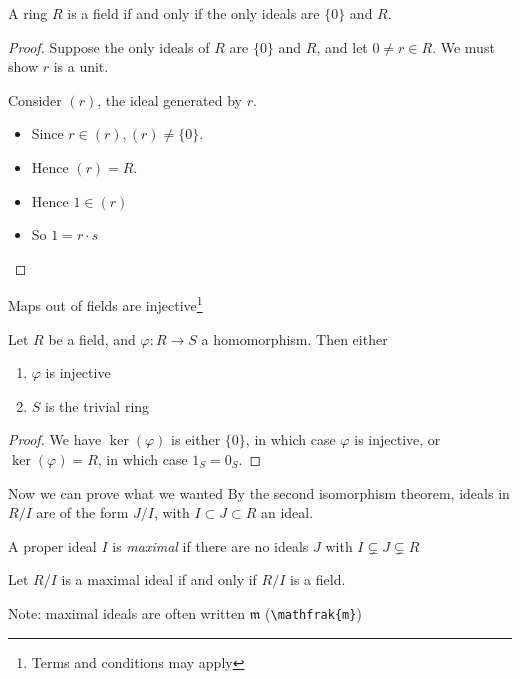\documentclass{beamer}
\begin{document}
\begin{frame}

\begin{lemma} A ring $R$ is a field if and only if the only ideals are $\{0\}$ and $R$.
\end{lemma}
\begin{proof}
Suppose the only ideals of $R$ are $\{0\}$ and $R$, and let $0\neq r\in R$.  We must show $r$ is a unit.

Consider $(r)$, the ideal generated by $r$. 
\begin{itemize}
\item  Since $r\in(r), (r)\neq\{0\}$.  
\item Hence $(r)=R$.  
\item Hence $1\in (r)$
\item So $1=r\cdot s$
\end{itemize}


\end{proof}

\end{frame}

\begin{frame}{Maps out of fields are injective\footnote{Terms and conditions may apply}}
\begin{lemma} Let $R$ be a field, and $\varphi:R\to S$ a homomorphism.  Then either
\begin{enumerate}
\item $\varphi$ is injective
\item $S$ is the trivial ring
\end{enumerate}
\end{lemma}

\begin{proof}
We have $\ker(\varphi)$ is either $\{0\}$, in which case $\varphi$ is injective, or $\ker(\varphi)=R$, in which case $1_S=0_S$.
\end{proof}

\end{frame}

\begin{frame}{Now we can prove what we wanted }
By the second isomorphism theorem, ideals in $R/I$ are of the form $J/I$, with $I\subset J\subset R$ an ideal.

\begin{definition}
A proper ideal $I$ is \emph{maximal} if there are no ideals $J$ with $I\subsetneq J\subsetneq R$
\end{definition}

\begin{lemma}
Let $R/I$ is a maximal ideal if and only if $R/I$ is a field.
\end{lemma}

Note: maximal ideals are often written $\mathfrak{m}$ ({\tt \textbackslash mathfrak\{m\}})


\end{frame}
\end{document}
